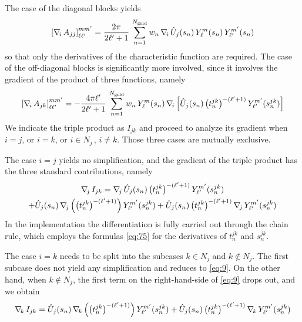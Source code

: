 The case of the diagonal blocks yields
\[
{[\nabla_{\!i}\, A_{jj}]}_{\ell \ell'}^{mm'} = \frac{2\pi}{2 \ell' + 1} \,\sum_{n=1}^{N_\text{grid}} w_n \, \nabla_{\!i}\, \hat{U}_j(s_n)  \,Y_\ell^m(s_n) \,  Y_{\ell'}^{m'}(s_n)
\]
so that only the derivatives of the characteristic function are required. The case of the off-diagonal blocks is significantly more involved, since it involves the gradient of the product of three functions, namely
\begin{equation}\label{eq:7}
{[\nabla_{\!i}\,A_{jk}]}_{\ell \ell'}^{mm'} = -  \frac{4 \pi \ell'}{2 \ell'+1} \, \sum_{n = 1}^{N_\text{grid}} w_n\, Y_\ell^m(s_n) \,\nabla_{\!i}\, \Big[ \hat{U}_j(s_n)  \,  \big( t_n^{jk}\big)^{-(\ell'+1)} \, Y_{\ell'}^{m'} (s_n^{jk}) \Big]
\end{equation}
We indicate the triple product as $I_{jk}$ and proceed to analyze its gradient when $i = j$, or $i = k$, or $i \in N_j \, , \, i \not= k$. Those three cases are mutually exclusive.

The case $i = j$ yields no simplification, and the gradient of the triple product has the three standard contributions, namely
\begin{multline}\label{eq:9}
\nabla_{\!j}\, I_{jk}= \nabla_{\!j}\, \hat{U}_j(s_n)  \,  \big( t_n^{jk}\big)^{-(\ell'+1)} \, Y_{\ell'}^{m'} (s_n^{jk}) \\
+ \hat{U}_j(s_n)  \, \nabla_{\!j}\, \Big(  \big( t_n^{jk}\big)^{-(\ell'+1)} \Big) \, Y_{\ell'}^{m'} (s_n^{jk}) +  \hat{U}_j(s_n)  \,  \big( t_n^{jk}\big)^{-(\ell'+1)} \, \nabla_{\!j}\, Y_{\ell'}^{m'} (s_n^{jk})
\end{multline}
In the implementation the differentiation is fully carried out through the chain rule, which employs the formulas \eqref{eq:75} for the derivatives of $t_n^{jk}$ and $s_n^{jk}$.

The case $i =k$ needs to be split into the subcases $k \in N_j$ and $k \not \in N_j$. The first subcase does not yield any simplification and reduces to \eqref{eq:9}. On the other hand, when $k \not\in N_j$, the first term on the right-hand-side of \eqref{eq:9} drops out, and we obtain
\[
\nabla_{\!k}\, I_{jk} = 
 \hat{U}_j(s_n)  \, \nabla_{\!k}\, \Big(  \big( t_n^{jk}\big)^{-(\ell'+1)} \Big) \, Y_{\ell'}^{m'} (s_n^{jk}) +  \hat{U}_j(s_n)  \,  \big( t_n^{jk}\big)^{-(\ell'+1)} \, \nabla_{\!k}\, Y_{\ell'}^{m'} (s_n^{jk})
\]

